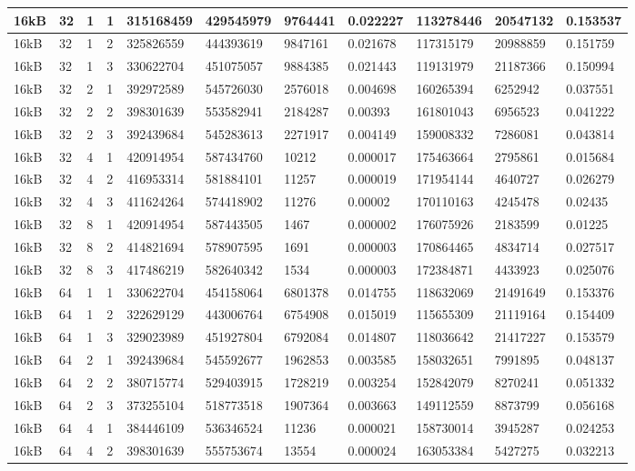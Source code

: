 \documentclass[conference]{IEEEtran}
\begin{document}
\begin{table}
\begin{tabular}{|m{.75cm} |m{.75cm} |m{.8cm} | m{.75cm} | l | l | l | l | l | l | l |}
        16kB&32&1&1&315168459&429545979&9764441&0.022227&113278446&20547132&0.153537\\ \hline
        16kB&32&1&2&325826559&444393619&9847161&0.021678&117315179&20988859&0.151759\\ \hline
        16kB&32&1&3&330622704&451075057&9884385&0.021443&119131979&21187366&0.150994\\ \hline
        16kB&32&2&1&392972589&545726030&2576018&0.004698&160265394&6252942&0.037551\\ \hline
        16kB&32&2&2&398301639&553582941&2184287&0.00393&161801043&6956523&0.041222\\ \hline
        16kB&32&2&3&392439684&545283613&2271917&0.004149&159008332&7286081&0.043814\\ \hline
        16kB&32&4&1&420914954&587434760&10212&0.000017&175463664&2795861&0.015684\\ \hline
        16kB&32&4&2&416953314&581884101&11257&0.000019&171954144&4640727&0.026279\\ \hline
        16kB&32&4&3&411624264&574418902&11276&0.00002&170110163&4245478&0.02435\\ \hline
        16kB&32&8&1&420914954&587443505&1467&0.000002&176075926&2183599&0.01225\\ \hline
        16kB&32&8&2&414821694&578907595&1691&0.000003&170864465&4834714&0.027517\\ \hline
        16kB&32&8&3&417486219&582640342&1534&0.000003&172384871&4433923&0.025076\\ \hline
        16kB&64&1&1&330622704&454158064&6801378&0.014755&118632069&21491649&0.153376\\ \hline
        16kB&64&1&2&322629129&443006764&6754908&0.015019&115655309&21119164&0.154409\\ \hline
        16kB&64&1&3&329023989&451927804&6792084&0.014807&118036642&21417227&0.153579\\ \hline
        16kB&64&2&1&392439684&545592677&1962853&0.003585&158032651&7991895&0.048137\\ \hline
        16kB&64&2&2&380715774&529403915&1728219&0.003254&152842079&8270241&0.051332\\ \hline
        16kB&64&2&3&373255104&518773518&1907364&0.003663&149112559&8873799&0.056168\\ \hline
        16kB&64&4&1&384446109&536346524&11236&0.000021&158730014&3945287&0.024253\\ \hline
        16kB&64&4&2&398301639&555753674&13554&0.000024&163053384&5427275&0.032213\\ \hline

\end{tabular}
\end{table}
\end{document}
